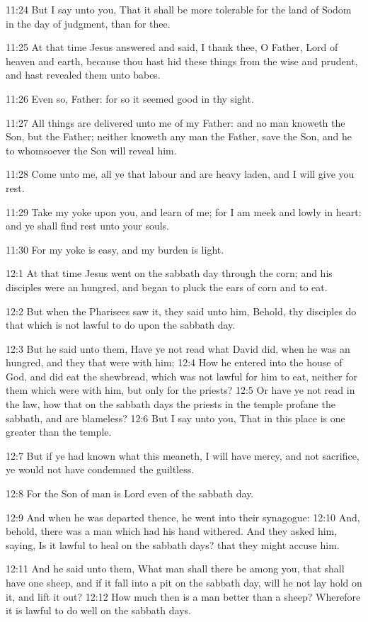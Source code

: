 11:24 But I say unto you, That it shall be more tolerable for the land
of Sodom in the day of judgment, than for thee.

11:25 At that time Jesus answered and said, I thank thee, O Father,
Lord of heaven and earth, because thou hast hid these things from the
wise and prudent, and hast revealed them unto babes.

11:26 Even so, Father: for so it seemed good in thy sight.

11:27 All things are delivered unto me of my Father: and no man
knoweth the Son, but the Father; neither knoweth any man the Father,
save the Son, and he to whomsoever the Son will reveal him.

11:28 Come unto me, all ye that labour and are heavy laden, and I will
give you rest.

11:29 Take my yoke upon you, and learn of me; for I am meek and lowly
in heart: and ye shall find rest unto your souls.

11:30 For my yoke is easy, and my burden is light.

12:1 At that time Jesus went on the sabbath day through the corn; and
his disciples were an hungred, and began to pluck the ears of corn and
to eat.

12:2 But when the Pharisees saw it, they said unto him, Behold, thy
disciples do that which is not lawful to do upon the sabbath day.

12:3 But he said unto them, Have ye not read what David did, when he
was an hungred, and they that were with him; 12:4 How he entered into
the house of God, and did eat the shewbread, which was not lawful for
him to eat, neither for them which were with him, but only for the
priests?  12:5 Or have ye not read in the law, how that on the sabbath
days the priests in the temple profane the sabbath, and are blameless?
12:6 But I say unto you, That in this place is one greater than the
temple.

12:7 But if ye had known what this meaneth, I will have mercy, and not
sacrifice, ye would not have condemned the guiltless.

12:8 For the Son of man is Lord even of the sabbath day.

12:9 And when he was departed thence, he went into their synagogue:
12:10 And, behold, there was a man which had his hand withered. And
they asked him, saying, Is it lawful to heal on the sabbath days? that
they might accuse him.

12:11 And he said unto them, What man shall there be among you, that
shall have one sheep, and if it fall into a pit on the sabbath day,
will he not lay hold on it, and lift it out?  12:12 How much then is a
man better than a sheep? Wherefore it is lawful to do well on the
sabbath days.

